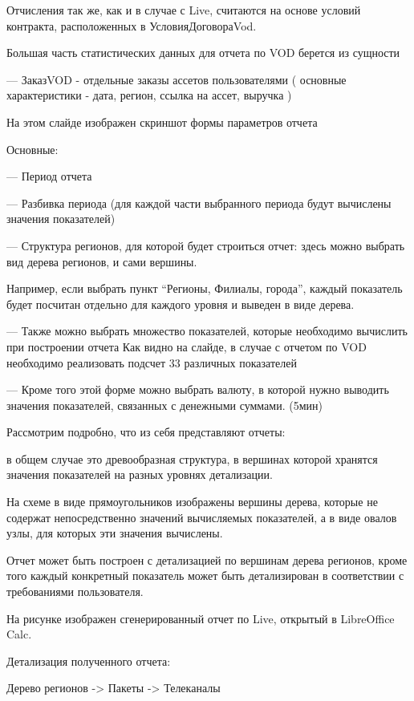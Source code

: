 \documentclass[a4paper]{article}
\begin{document}
Отчисления так же, как и в случае с Live, считаются на основе условий контракта, расположенных в УсловияДоговораVod.

\newpage

Большая часть статистических данных для отчета по VOD берется из сущности

--- ЗаказVOD - отдельные заказы ассетов пользователями ( основные характеристики - дата, регион, ссылка на ассет, выручка )

\newpage
На этом слайде изображен скриншот формы параметров отчета

Основные:

--- Период отчета

--- Разбивка периода (для каждой части выбранного периода будут вычислены значения показателей)

\newpage
--- Структура регионов, для которой будет строиться отчет: здесь можно выбрать вид дерева регионов, и сами вершины.

Например, если выбрать пункт “Регионы, Филиалы, города”, каждый показатель будет посчитан отдельно для каждого уровня и выведен в виде дерева.


\newpage
--- Также можно выбрать множество показателей, которые необходимо вычислить при построении отчета
Как видно на слайде, в случае с отчетом по VOD необходимо реализовать подсчет 33 различных показателей

--- Кроме того этой форме можно выбрать валюту, в которой нужно выводить значения показателей, связанных с денежными суммами.
(5мин)

\newpage
Рассмотрим подробно, что из себя представляют отчеты:

в общем случае это древообразная структура, в вершинах которой хранятся значения показателей
на разных уровнях детализации.

На схеме в виде прямоугольников изображены вершины дерева,
которые не содержат непосредственно значений вычисляемых показателей, а в виде овалов узлы,
для которых эти значения вычислены. 

Отчет может быть построен с детализацией 
по вершинам дерева регионов, кроме того каждый конкретный показатель может быть детализирован
в соответствии с требованиями пользователя.

\newpage
На рисунке изображен сгенерированный отчет по Live, открытый в LibreOffice Calc.

Детализация полученного отчета:

Дерево регионов -> Пакеты -> Телеканалы
\end{document}
